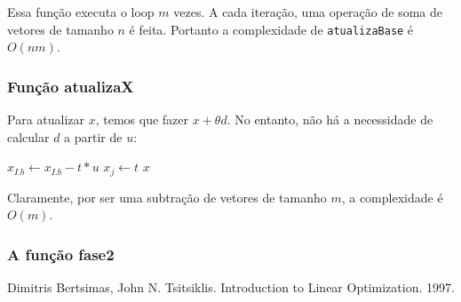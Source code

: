 \documentclass[12pt]{article}
\begin{document}
Essa função executa o loop $m$ vezes. A cada iteração, uma operação de soma de vetores de tamanho $n$ é feita. Portanto a complexidade de \texttt{atualizaBase} é $O(nm)$.

\subsubsection{Função atualizaX}
Para atualizar $x$, temos que fazer $x + \theta d$. No entanto, não há a necessidade de calcular $d$ a partir de $u$:
\begin{algorithmic}
	\State $x_{I.b} \gets x_{I.b} - t * u$
	\State $x_j \gets t$
	\Return $x$
\EndFunction
\end{algorithmic}
Claramente, por ser uma subtração de vetores de tamanho $m$, a complexidade é $O(m)$.

\subsubsection{A função fase2}



\newpage


	

\newpage
\begin{thebibliography}{9}
 Dimitris Bertsimas, John N. Tsitsiklis. Introduction to Linear Optimization. 1997.
\end{thebibliography}
\end{document}
